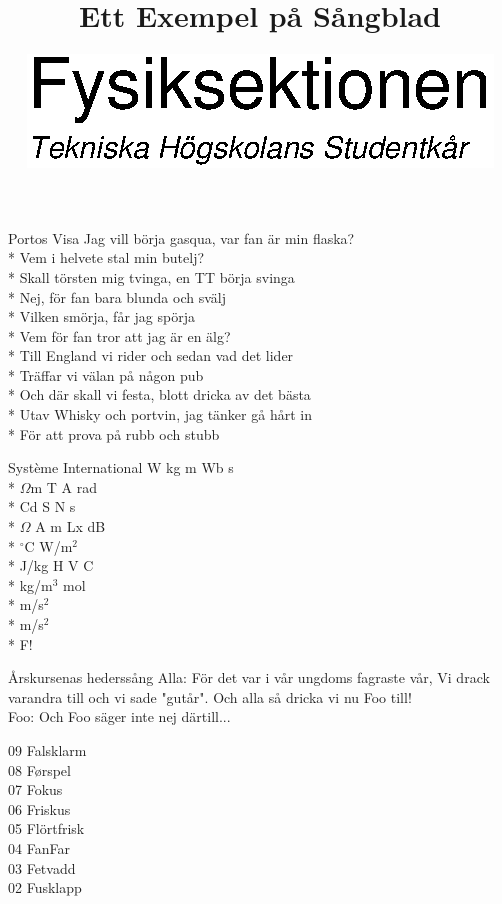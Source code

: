 \documentclass[a4paper, twoside, titlepage]{blad}
\title{Ett Exempel på Sångblad}
\author{\includegraphics[width=.8 \textwidth ]{logo.eps}	}
\date{}                          %
\begin{document}
\maketitle
\begin{sang}{Portos Visa}
Jag vill börja gasqua, var fan är min flaska?\\*
Vem i helvete stal min butelj?\\*
Skall törsten mig tvinga, en TT börja svinga\\*
Nej, för fan bara blunda och svälj\\*
Vilken smörja, får jag spörja\\*
Vem för fan tror att jag är en älg?\\*
Till England vi rider och sedan vad det lider\\*
Träffar vi välan på någon pub\\*
Och där skall vi festa, blott dricka av det bästa\\*
Utav Whisky och portvin, jag tänker gå hårt in\\*
För att prova på rubb och stubb
\end{sang}


\begin{sang}{Système International}
W kg m Wb s\\*
$\Omega$m T A rad\\*
Cd S N s\\*
$\Omega$ A m Lx dB\\*
$^\circ$C W/m$^2$\\*
J/kg H V C\\*
kg/m$^3$ mol\\*
m/s$^2$\\*
m/s$^2$\\*
F!
\end{sang}


\begin{sang}{Årskursenas hederssång}
Alla:   För det var i vår ungdoms fagraste vår,
Vi drack varandra till och vi sade "gutår".
Och alla så dricka vi nu Foo till! \\

Foo:    Och Foo säger inte nej därtill...

09 Falsklarm \\
08 F\o rspel \\
07 Fokus \\
06 Friskus \\
05 Flörtfrisk \\
04 FanFar \\
03 Fetvadd \\
02 Fusklapp \\
\end{sang}
\end{document}
